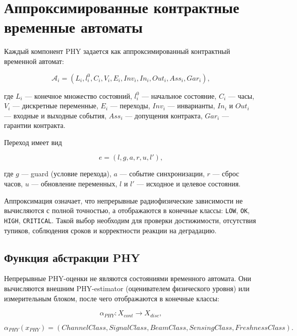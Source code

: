 \documentclass[12pt,a4paper]{article}
\begin{document}
\section{Аппроксимированные контрактные временные автоматы}

Каждый компонент PHY задается как аппроксимированный контрактный временной автомат:

\begin{equation}
\mathcal{A}_i =
(L_i,l_i^0,C_i,V_i,E_i,Inv_i,In_i,Out_i,Ass_i,Gar_i),
\end{equation}

где $L_i$ --- конечное множество состояний, $l_i^0$ --- начальное состояние, $C_i$ --- часы, $V_i$ --- дискретные переменные, $E_i$ --- переходы, $Inv_i$ --- инварианты, $In_i$ и $Out_i$ --- входные и выходные события, $Ass_i$ --- допущения контракта, $Gar_i$ --- гарантии контракта.

Переход имеет вид

\begin{equation}
e=(l,g,a,r,u,l'),
\end{equation}

где $g$ --- guard (условие перехода), $a$ --- событие синхронизации, $r$ --- сброс часов, $u$ --- обновление переменных, $l$ и $l'$ --- исходное и целевое состояния.

Аппроксимация означает, что непрерывные радиофизические зависимости не вычисляются с полной точностью, а отображаются в конечные классы: \texttt{LOW}, \texttt{OK}, \texttt{HIGH}, \texttt{CRITICAL}. Такой выбор необходим для проверки достижимости, отсутствия тупиков, соблюдения сроков и корректности реакции на деградацию.

\subsection{Функция абстракции PHY}

Непрерывные PHY-оценки не являются состояниями временного автомата. Они вычисляются внешним PHY-estimator (оценивателем физического уровня) или измерительным блоком, после чего отображаются в конечные классы:

\begin{equation}
\alpha_{PHY}:X_{cont}\rightarrow X_{disc},
\end{equation}

\begin{equation}
\alpha_{PHY}(x_{PHY}) =
(ChannelClass,SignalClass,BeamClass,SensingClass,FreshnessClass).
\end{equation}
\end{document}
